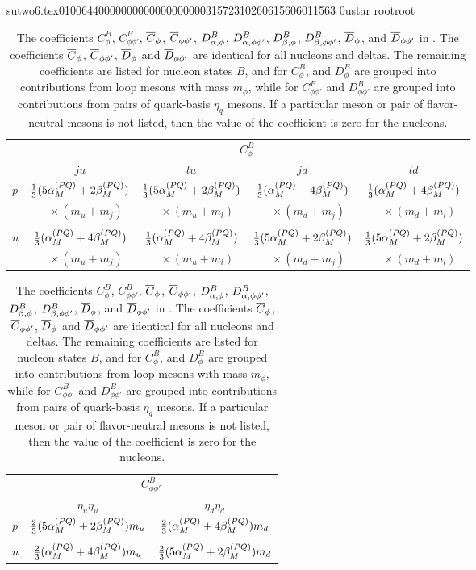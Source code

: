                                                                                                                                                                                                                                                                                       sutwo6.tex                                                                                          0100644 0000000 0000000 00000315723 10260615606 011563  0                                                                                                    ustar   root                            root                                                                                                                                                                                                                   \documentclass[prd,amssymb,amsmath,showpacs,nofootinbib,superscriptaddress]{revtex4}
\begin{document}
\begingroup
\squeezetable
\begin{table}[ht]
\caption{The coefficients $C^B_\phi$, $C^B_{\phi\phi'}$, ${\overline{C}}_\phi$,
  ${\overline{C}}_{\phi \phi'}$, $D^B_{{\alpha},\phi}$, $D^B_{{\alpha},\phi\phi'}$,
  $D^B_{{\beta},\phi}$, $D^B_{{\beta},\phi\phi'}$, ${\overline{D}}_\phi$, and ${\overline{D}}_{\phi \phi'}$ in \PQCPT. The coefficients ${\overline{C}}_\phi$,
  ${\overline{C}}_{\phi \phi'}$, ${\overline{D}}_\phi$ and ${\overline{D}}_{\phi \phi'}$ are identical for all nucleons and
  deltas. The remaining coefficients are listed for nucleon states
  $B$, and for $C^B_\phi$, and $D^B_\phi$ are grouped into
  contributions from loop  mesons with mass $m_\phi$, while for
  $C^B_{\phi\phi'}$ and $D^B_{\phi\phi'}$ are grouped into
  contributions from pairs of quark-basis $\eta_q$ mesons. If a
  particular meson or pair of flavor-neutral  mesons is not listed,
  then the value of the coefficient is zero for the nucleons. }
\begin{tabular}{l | c c c c }
& \multicolumn{4}{c}{$C^B_\phi $}\\
  & $\quad ju \quad$ 
  & $\quad lu \quad $ 
  & $\quad jd \quad $  
  & $\quad ld \quad$\\
\hline

$p$
  & $\frac{1}{3} (5 {\alpha}_M^{(PQ)} + 2 {\beta}_M^{(PQ)})$ 
  & $\frac{1}{3} (5 {\alpha}_M^{(PQ)} + 2 {\beta}_M^{(PQ)})$  
  & $\frac{1}{3} ({\alpha}_M^{(PQ)} + 4 {\beta}_M^{(PQ)})$ 
  & $\frac{1}{3} ({\alpha}_M^{(PQ)} + 4 {\beta}_M^{(PQ)})$\\

  & $\quad \times (m_u+ m_j)$ 
  & $\quad \times (m_u + m_l)$ 
  & $\quad \times (m_d + m_j)$ 
  & $\quad \times (m_d + m_l)$\\
\\
$n$ 
  & $\frac{1}{3} ({\alpha}_M^{(PQ)} + 4 {\beta}_M^{(PQ)})$ 
  & $\frac{1}{3} ({\alpha}_M^{(PQ)} + 4 {\beta}_M^{(PQ)})$  
  & $\frac{1}{3} (5 {\alpha}_M^{(PQ)} + 2 {\beta}_M^{(PQ)})$ 
  & $\frac{1}{3} (5 {\alpha}_M^{(PQ)} + 2 {\beta}_M^{(PQ)})$\\

  & $\quad \times (m_u+ m_j)$ 
  & $\quad \times (m_u + m_l)$ 
  & $\quad \times (m_d + m_j)$ 
  & $\quad \times (m_d + m_l)$\\
\end{tabular}

\bigskip

\begin{tabular}{l | c c }
&\multicolumn{2}{c}{$C^B_{\phi\phi'}$} \\
  & $\quad \eta_u \eta_u \quad$ 
  & $\quad \eta_d \eta_d \quad$ \\
\hline
$p$
  & $\frac{2}{3} (5 {\alpha}_M^{(PQ)} + 2 {\beta}_M^{(PQ)}) m_u$ 
  & $\frac{2}{3} ({\alpha}_M^{(PQ)} + 4 {\beta}_M^{(PQ)}) m_d$ \\ \\
$n$
  & $\frac{2}{3} ({\alpha}_M^{(PQ)} + 4 {\beta}_M^{(PQ)}) m_u$ 
  & $\frac{2}{3} (5 {\alpha}_M^{(PQ)} + 2 {\beta}_M^{(PQ)}) m_d$ \\
\end{tabular}


\end{table}
\end{document}
